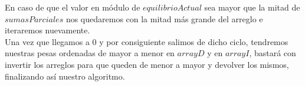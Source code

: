 En caso de que el valor en m\'odulo de $equilibrioActual$ sea mayor que la mitad de $sumasParciales$ nos quedaremos con la mitad m\'as grande del arreglo e iteraremos nuevamente.\\

Una vez que llegamos a 0 y por consiguiente salimos de dicho ciclo, tendremos nuestras pesas ordenadas de mayor a menor en $arrayD$ y en $arrayI$, bastar\'a con invertir los arreglos para que queden de menor a mayor y devolver los mismos, finalizando as\'i nuestro algoritmo.\\
